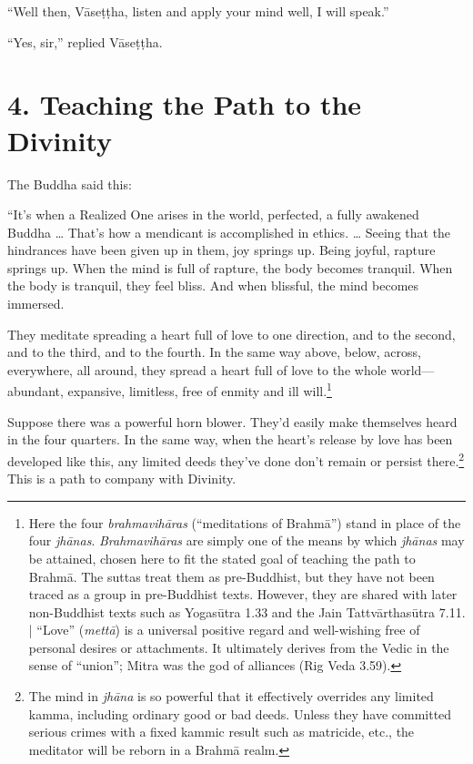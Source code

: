 \documentclass[12pt,openany]{book}%
\begin{document}
“Well then, \textsanskrit{Vāseṭṭha}, listen and apply your mind well, I will speak.” 

“Yes, sir,” replied \textsanskrit{Vāseṭṭha}. 

\section*{4. Teaching the Path to the Divinity }

The Buddha said this: 

“It’s when a Realized One arises in the world, perfected, a fully awakened Buddha … That’s how a mendicant is accomplished in ethics. … Seeing that the hindrances have been given up in them, joy springs up. Being joyful, rapture springs up. When the mind is full of rapture, the body becomes tranquil. When the body is tranquil, they feel bliss. And when blissful, the mind becomes immersed. 

They meditate spreading a heart full of love to one direction, and to the second, and to the third, and to the fourth. In the same way above, below, across, everywhere, all around, they spread a heart full of love to the whole world—abundant, expansive, limitless, free of enmity and ill will.\footnote{Here the four \textit{\textsanskrit{brahmavihāras}} (“meditations of \textsanskrit{Brahmā}”) stand in place of the four \textit{\textsanskrit{jhānas}}. \textit{\textsanskrit{Brahmavihāras}} are simply one of the means by which \textit{\textsanskrit{jhānas}} may be attained, chosen here to fit the stated goal of teaching the path to \textsanskrit{Brahmā}. The suttas treat them as pre-Buddhist, but they have not been traced as a group in pre-Buddhist texts. However, they are shared with later non-Buddhist texts such as  \textsanskrit{Yogasūtra} 1.33 and the Jain \textsanskrit{Tattvārthasūtra} 7.11. | “Love” (\textit{\textsanskrit{mettā}}) is a universal positive regard and well-wishing free of personal desires or attachments. It ultimately derives from the Vedic in the sense of “union”; Mitra was the god of alliances (Rig Veda 3.59). } 

Suppose there was a powerful horn blower. They’d easily make themselves heard in the four quarters. In the same way, when the heart’s release by love has been developed like this, any limited deeds they’ve done don’t remain or persist there.\footnote{The mind in \textit{\textsanskrit{jhāna}} is so powerful that it effectively overrides any limited kamma, including ordinary good or bad deeds. Unless they have committed serious crimes with a fixed kammic result such as matricide, etc., the meditator will be reborn in a \textsanskrit{Brahmā} realm. } This is a path to company with Divinity. 
\end{document}
